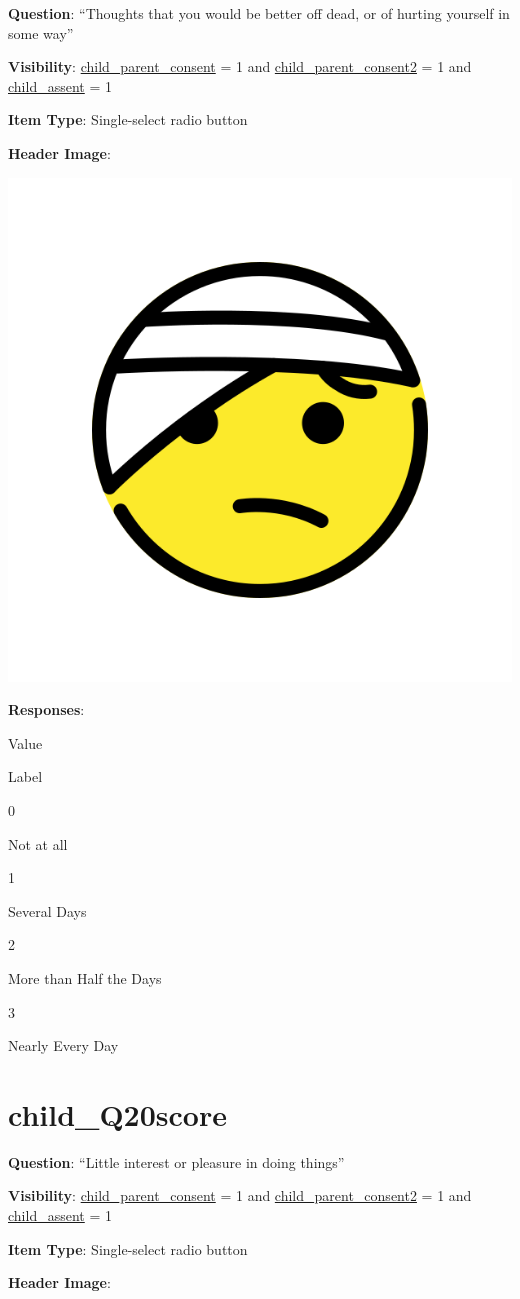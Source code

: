 \documentclass[]{book}
\begin{document}
\textbf{Question}: ``Thoughts that you would be better off dead, or of hurting yourself in some way''

\textbf{Visibility}: \protect\hyperlink{child_parent_consent}{child\_parent\_consent} = 1 and \protect\hyperlink{child_parent_consent2}{child\_parent\_consent2} = 1 and \protect\hyperlink{child_assent}{child\_assent} = 1

\textbf{Item Type}: Single-select radio button

\textbf{Header Image}:

\begin{flushleft}\includegraphics[width=0.33\linewidth]{downloadFigs4latex_HBN_PMHS_Codebook/child_Q19score_headerImg} \end{flushleft}

\textbf{Responses}:

Value

Label

0

Not at all

1

Several Days

2

More than Half the Days

3

Nearly Every Day

\hypertarget{child_q20score}{%
\section{child\_Q20score}\label{child_q20score}}

\textbf{Question}: ``Little interest or pleasure in doing things''

\textbf{Visibility}: \protect\hyperlink{child_parent_consent}{child\_parent\_consent} = 1 and \protect\hyperlink{child_parent_consent2}{child\_parent\_consent2} = 1 and \protect\hyperlink{child_assent}{child\_assent} = 1

\textbf{Item Type}: Single-select radio button

\textbf{Header Image}:
\end{document}

